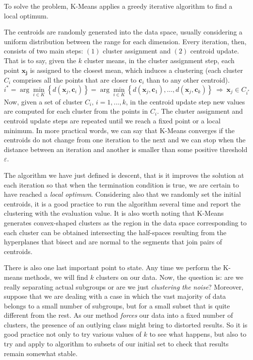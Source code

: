 \documentclass[a4paper]{article}
\begin{document}
	
	To solve the problem, K-Means applies a greedy iterative algorithm to find a local optimum.
	
	The centroids are randomly generated into the data space, usually considering a uniform distribution between the range for each dimension. Every iteration, then, consists of two main steps: $(1)$ cluster assignment and $(2)$ centroid update. That is to say, given the $k$ cluster means, in the cluster assignment step, each point $\boldsymbol{x_{j}}$ is assigned to the closest mean, which induces a clustering (each cluster $C_{i}$ comprises all the points that are closer to $\boldsymbol{c}_{i}$ than to any other centroid).
	\begin{equation*}
	i^{*}=\arg\underset{i\in K}{ \min}\left\{ d(\boldsymbol{x}_{j},\boldsymbol{c}_{i})\right\} =\arg\min_{i \in K}\left\{ d(\boldsymbol{x}_{j},\boldsymbol{c}_{1}),\ldots,d(\boldsymbol{x}_{j},\boldsymbol{c}_{k})\right\} \:\Longrightarrow\:\boldsymbol{x}_{j}\in C_{i^{*}}
	\end{equation*}
	Now, given a set of cluster $C_{i},\, i=1,...,k$, in the centroid update step new values are computed for each cluster from the points in $C_{i}$. The cluster assignment and centroid update steps are repeated until we reach a fixed point or a local minimum. In more practical words, we can say that K-Means converges if the centroids do not change from one iteration to the next and we can stop when the distance between an iteration and another is smaller than some positive threshold $\varepsilon$.
		
	The algorithm we have just defined is descent, that is it improves
	the solution at each iteration so that when the termination condition
	is true, we are certain to have reached a \textsl{local optimum}.
	Considering also that we randomly set the initial centroids, it is a good practice to run the algorithm several time and report the clustering with the evaluation value. It is also worth noting that K-Means generates convex-shaped clusters as the region in the data space corresponding to each cluster can be obtained intersecting the half-spaces resulting from the hyperplanes that bisect and are normal to the segments that join pairs of centroids.
		
	There is also one last important point to state. Any time we perform
	the K-means methods, we will find $k$ clusters on our data. Now,
	the question is: are we really separating actual subgroups or are
	we just \textsl{clustering the noise}? Moreover, suppose that we are
	dealing with a case in which the vast majority of data belongs to
	a small number of subgroups, but for a small subset that is quite
	different from the rest. As our method \textsl{forces} our data into
	a fixed number of clusters, the presence of an outlying class might
	bring to distorted results. So it is good practice not only to try
	various values of $k$ to see what happens, but also to try and apply
	to algorithm to subsets of our initial set to check that results remain
	somewhat stable.
	
\end{document}

